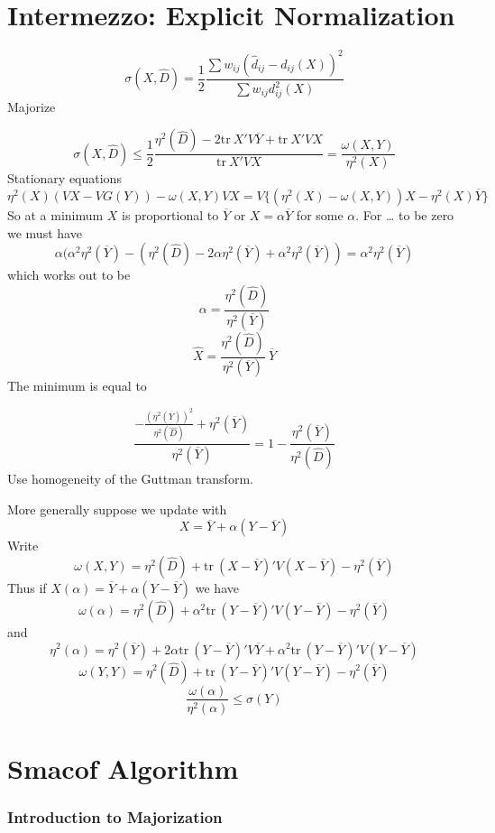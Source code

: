 \documentclass[
  12pt,
]{article}
\begin{document}
\section{Intermezzo: Explicit Normalization}\label{intermezzo-explicit-normalization}

\[
\sigma(X,\hat D)=\frac12\frac{\sum w_{ij}(\hat d_{ij}-d_{ij}(X))^2}{\sum w_{ij}d_{ij}^2(X)}
\]
Majorize

\[
\sigma(X,\hat D)\leq\frac12\frac{\eta^2(\hat D)-2\text{tr}\ X'V\overline{Y}+\text{tr}\ X'VX}{\text{tr}\ X'VX}=\frac{\omega(X,Y)}{\eta^2(X)}
\]
Stationary equations
\[
\eta^2(X)(VX-VG(Y))-\omega(X,Y)VX=V\{(\eta^2(X)-\omega(X,Y))X-\eta^2(X)\overline Y\}
\]
So at a minimum \(X\) is proportional to \(\overline{Y}\) or \(X=\alpha\overline{Y}\) for some \(\alpha\). For \ldots{} to be zero we must have
\[
\alpha(\alpha^2\eta^2(\overline Y)-(\eta^2(\hat D)-2\alpha\eta^2(\overline Y)+\alpha^2\eta^2(\overline Y))=\alpha^2\eta^2(\overline Y)
\]
which works out to be
\[
\alpha=\frac{\eta^2(\hat D)}{\eta^2(\overline Y)}
\]
\[
\hat X=\frac{\eta^2(\hat D)}{\eta^2(\overline Y)}\ \overline{Y}
\]
The minimum is equal to

\[
\frac{-\frac{(\eta^2(\overline Y))^2}{\eta^2(\hat D)}+\eta^2(\overline Y)}{\eta^2(\overline Y)}=1-\frac{\eta^2(\overline Y)}{\eta^2(\hat D)}
\]
Use homogeneity of the Guttman transform.

More generally suppose we update with
\[
X=\overline Y+\alpha(Y-\overline Y)
\]
Write
\[
\omega(X,Y)=\eta^2(\hat D)+\text{tr}\ (X-\overline Y)'V(X-\overline Y)-\eta^2(\overline Y)
\]
Thus if \(X(\alpha)=\overline Y+\alpha(Y-\overline Y)\) we have
\[
\omega(\alpha)=\eta^2(\hat D)+\alpha^2\text{tr}\ (Y-\overline Y)'V(Y-\overline Y)-\eta^2(\overline Y)
\]
and
\[
\eta^2(\alpha)=\eta^2(\overline Y)+2\alpha\text{tr}\ (Y-\overline Y)'V\overline Y+\alpha^2\text{tr}\ (Y-\overline Y)'V(Y-\overline Y)
\]
\[
\omega(Y,Y)=\eta^2(\hat D)+\text{tr}\ (Y-\overline Y)'V(Y-\overline Y)-\eta^2(\overline Y)
\]
\[
\frac{\omega(\alpha)}{\eta^2(\alpha)}\leq\sigma(Y)
\]

\section{Smacof Algorithm}\label{smacof-algorithm}

\subsubsection{Introduction to Majorization}\label{introduction-to-majorization}
\end{document}
